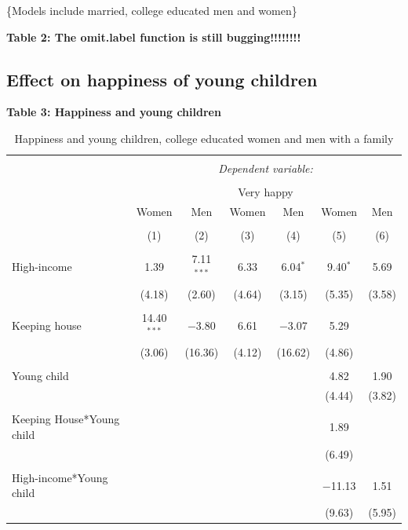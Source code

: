 \documentclass[]{article}
\begin{document}
\{\tiny{Models include married, college educated men and women}\}

\textbf{Table 2: The omit.label function is still bugging!!!!!!!!}

\subsection{Effect on happiness of young
children}\label{effect-on-happiness-of-young-children}

\textbf{Table 3: Happiness and young children}

\begin{table}[!htbp] \centering 
  \caption{Happiness and young children, college educated women and men with a family} 
  \label{} 
\begin{tabular}{@{\extracolsep{5pt}}lcccccc} 
\\[-1.8ex]\hline 
\hline \\[-1.8ex] 
 & \multicolumn{6}{c}{\textit{Dependent variable:}} \\ 
\cline{2-7} 
\\[-1.8ex] & \multicolumn{6}{c}{Very happy} \\ 
 & Women & Men & Women & Men & Women & Men \\ 
\\[-1.8ex] & (1) & (2) & (3) & (4) & (5) & (6)\\ 
\hline \\[-1.8ex] 
 High-income & 1.39 & 7.11$^{***}$ & 6.33 & 6.04$^{*}$ & 9.40$^{*}$ & 5.69 \\ 
  & (4.18) & (2.60) & (4.64) & (3.15) & (5.35) & (3.58) \\ 
  & & & & & & \\ 
 Keeping house & 14.40$^{***}$ & $-$3.80 & 6.61 & $-$3.07 & 5.29 &  \\ 
  & (3.06) & (16.36) & (4.12) & (16.62) & (4.86) &  \\ 
  & & & & & & \\ 
 Young child &  &  &  &  & 4.82 & 1.90 \\ 
  &  &  &  &  & (4.44) & (3.82) \\ 
  & & & & & & \\ 
 Keeping House*Young child &  &  &  &  & 1.89 &  \\ 
  &  &  &  &  & (6.49) &  \\ 
  & & & & & & \\ 
 High-income*Young child &  &  &  &  & $-$11.13 & 1.51 \\ 
  &  &  &  &  & (9.63) & (5.95) \\ 

\end{tabular}
\end{table}
\end{document}
